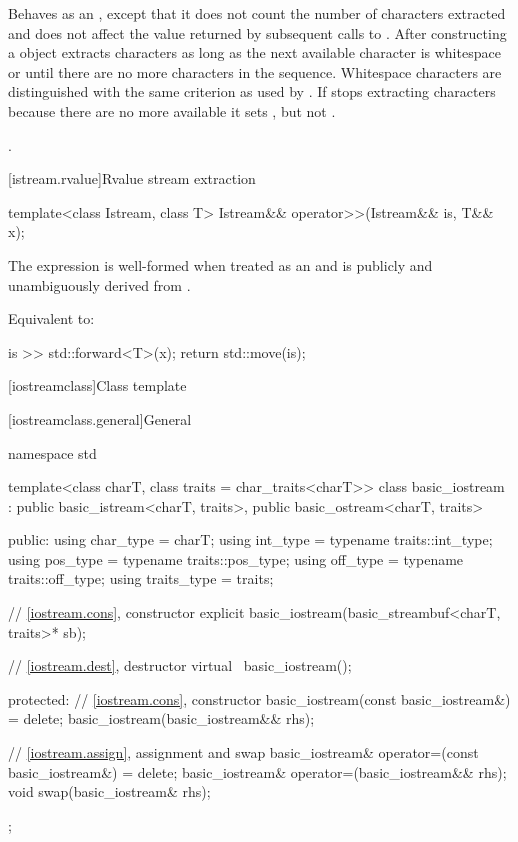 \begin{itemdescr}
\pnum
\effects
Behaves as an , except that it does not count the number of characters extracted and
does not affect the value returned by subsequent calls to . After
constructing a  object extracts characters as long as the next available
character  is whitespace or until there are no more characters in the sequence.
Whitespace characters are distinguished with the same criterion as used by
.
If
stops extracting characters because there are no more available it sets
,
but not
.

\pnum
\returns
{}.
\end{itemdescr}

[istream.rvalue]{Rvalue stream extraction}

%
\begin{itemdecl}
template<class Istream, class T>
  Istream&& operator>>(Istream&& is, T&& x);
\end{itemdecl}

\begin{itemdescr}
\pnum
\constraints
The expression  is well-formed
when treated as an  and
 is publicly and unambiguously derived from .

\pnum
\effects
Equivalent to:
\begin{codeblock}
is >> std::forward<T>(x);
return std::move(is);
\end{codeblock}
\end{itemdescr}

[iostreamclass]{Class template }

[iostreamclass.general]{General}

%
\begin{codeblock}
namespace std {
  template<class charT, class traits = char_traits<charT>>
  class basic_iostream
    : public basic_istream<charT, traits>,
      public basic_ostream<charT, traits> {
  public:
    using char_type   = charT;
    using int_type    = typename traits::int_type;
    using pos_type    = typename traits::pos_type;
    using off_type    = typename traits::off_type;
    using traits_type = traits;

    // \ref{iostream.cons}, constructor
    explicit basic_iostream(basic_streambuf<charT, traits>* sb);

    // \ref{iostream.dest}, destructor
    virtual ~basic_iostream();

  protected:
    // \ref{iostream.cons}, constructor
    basic_iostream(const basic_iostream&) = delete;
    basic_iostream(basic_iostream&& rhs);

    // \ref{iostream.assign}, assignment and swap
    basic_iostream& operator=(const basic_iostream&) = delete;
    basic_iostream& operator=(basic_iostream&& rhs);
    void swap(basic_iostream& rhs);
  };
}
\end{codeblock}

